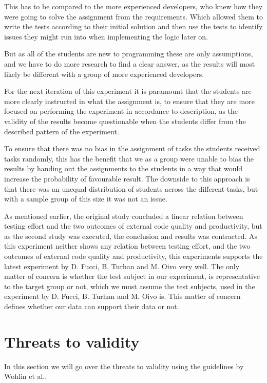 \documentclass{sig-alternate-05-2015}
\begin{document}
This has to be compared to the more experienced developers, who knew how they were going to solve the assignment from the requirements. Which allowed them to write the tests according to their initial solution and then use the tests to identify issues they might run into when implementing the logic later on.

But as all of the students are new to programming these are only assumptions, and we have to do more research to find a clear answer, as the results will most likely be different with a group of more experienced developers.

For the next iteration of this experiment it is paramount that the students are more clearly instructed in what the assignment is, to ensure that they are more focused on performing the experiment in accordance to description, as the validity of the results become questionable when the students differ from the described pattern of the experiment. 

To ensure that there was no bias in the assignment of tasks the students received tasks randomly, this has the benefit that we as a group were unable to bias the results by handing out the assignments to the students in a way that would increase the probability of favourable result. The downside to this approach is that there was an unequal distribution of students across the different tasks, but with a sample group of this size it was not an issue.

As mentioned earlier, the original study concluded a linear relation between testing effort and the two outcomes of external code quality and productivity, but as the second study was executed, the conclusion and results was contracted. As this experiment neither shows any relation between testing effort, and the two outcomes of external code quality and productivity, this experiments supports the latest experiment by D. Fucci, B. Turhan and M. Oivo very well. The only matter of concern is whether the test subject in our experiment, is representative to the target group or not, which we must assume the test subjects, used in the experiment by D. Fucci, B. Turhan and M. Oivo is. This matter of concern defines whether our data can support their data or not.


\section{Threats to validity}
\label{sec:Threats to validity}
In this section we will go over the threats to validity using the guidelines by Wohlin et al.\cite{wohlin1}.
\end{document}
